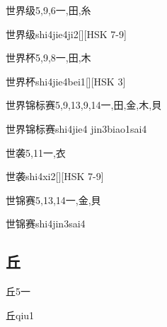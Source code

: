 \begin{Entry}{世界级}{5,9,6}{⼀,⽥,⽷}
  \begin{Phonetics}{世界级}{shi4jie4ji2}[][HSK 7-9]
  \end{Phonetics}
\end{Entry}

\begin{Entry}{世界杯}{5,9,8}{⼀,⽥,⽊}
  \begin{Phonetics}{世界杯}{shi4jie4bei1}[][HSK 3]
  \end{Phonetics}
\end{Entry}

\begin{Entry}{世界锦标赛}{5,9,13,9,14}{⼀,⽥,⾦,⽊,⾙}
  \begin{Phonetics}{世界锦标赛}{shi4jie4 jin3biao1sai4}
  \end{Phonetics}
\end{Entry}

\begin{Entry}{世袭}{5,11}{⼀,⾐}
  \begin{Phonetics}{世袭}{shi4xi2}[][HSK 7-9]
  \end{Phonetics}
\end{Entry}

\begin{Entry}{世锦赛}{5,13,14}{⼀,⾦,⾙}
  \begin{Phonetics}{世锦赛}{shi4jin3sai4}
  \end{Phonetics}
\end{Entry}

\subsection*{丘}

\begin{Entry}{丘}{5}{⼀}
  \begin{Phonetics}{丘}{qiu1}
  \end{Phonetics}
\end{Entry}

